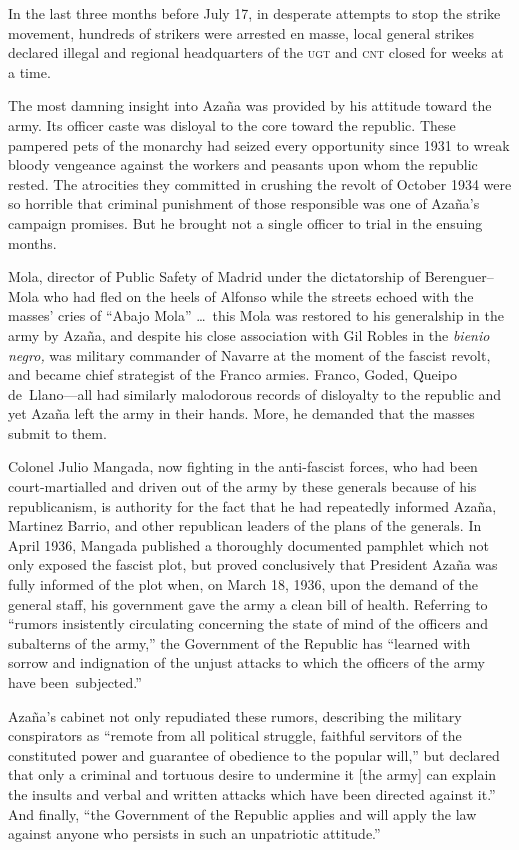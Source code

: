 In the last three months before July 17, in desperate attempts to stop the strike movement, hundreds of strikers were arrested en masse, local general strikes declared illegal and regional headquarters of the \textsc{ugt} and \textsc{cnt} closed for weeks at a time.

The most damning insight into Azaña was provided by his attitude toward the army. Its officer caste was disloyal to the core toward the republic. These pampered pets of the monarchy had seized every opportunity since 1931 to wreak bloody vengeance against the workers and peasants upon whom the republic rested. The atrocities they committed in crushing the revolt of October 1934 were so horrible that criminal punishment of those responsible was one of Azaña’s campaign promises. But he brought not a single officer to trial in the ensuing months.

Mola, director of Public Safety of Madrid under the dictatorship of Berenguer--Mola who had fled on the heels of Alfonso while the streets echoed with the masses’ cries of ``Abajo Mola'' \dots\ this Mola was restored to his generalship in the army by Azaña, and despite his close association with Gil Robles in the \emph{bienio negro,} was military commander of Navarre at the moment of the fascist revolt, and became chief strategist of the Franco armies. Franco, Goded, Queipo de~Llano—all had similarly malodorous records of disloyalty to the republic and yet Azaña left the army in their hands. More, he demanded that the masses submit to them.

Colonel Julio Mangada, now fighting in the anti-fascist forces, who had been court-martialled and driven out of the army by these generals because of his republicanism, is authority for the fact that he had repeatedly informed Azaña, Martinez Barrio, and other republican leaders of the plans of the generals. In April 1936, Mangada published a thoroughly documented pamphlet which not only exposed the fascist plot, but proved conclusively that President Azaña was fully informed of the plot when, on March 18, 1936, upon the demand of the general staff, his government gave the army a clean bill of health. Referring to ``rumors insistently circulating concerning the state of mind of the officers and subalterns of the army,'' the Government of the Republic has ``learned with sorrow and indignation of the unjust attacks to which the officers of the army have been~subjected.''

Azaña’s cabinet not only repudiated these rumors, describing the military conspirators as ``remote from all political struggle, faithful servitors of the constituted power and guarantee of obedience to the popular will,'' but declared that only a criminal and tortuous desire to undermine it [the army] can explain the insults and verbal and written attacks which have been directed against it.'' And finally, ``the Government of the Republic applies and will apply the law against anyone who persists in such an unpatriotic attitude.''

